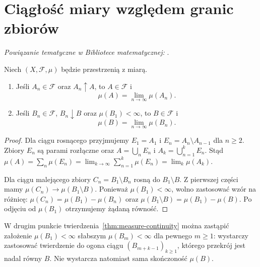 \section{Ciągłość miary względem granic zbiorów}

\noindent\emph{Powiązanie tematyczne w Bibliotece matematycznej:} .


\begin{twierdzenie}
\label{thm:measure-continuity}
Niech $(X,\mathcal F,\mu)$ będzie przestrzenią z miarą.
\begin{enumerate}
\item Jeśli $A_n\in\mathcal F$ oraz $A_n\uparrow A$, to
$A\in\mathcal F$ i
\begin{equation}
\label{eq:continuity-below}
\mu(A)=\lim_{n\to\infty}\mu(A_n).
\end{equation}
\item Jeśli $B_n\in\mathcal F$, $B_n\downarrow B$ oraz
$\mu(B_1)<\infty$, to $B\in\mathcal F$ i
\begin{equation}
\label{eq:continuity-above}
\mu(B)=\lim_{n\to\infty}\mu(B_n).
\end{equation}
\end{enumerate}
\end{twierdzenie}
\begin{proof}
Dla ciągu rosnącego przyjmujemy $E_1=A_1$ i
$E_n=A_n\setminus A_{n-1}$ dla $n\geq2$.
Zbiory $E_n$ są parami rozłączne oraz
$A=\bigcup_nE_n$ i $A_k=\bigcup_{n=1}^kE_n$.
Stąd
$\mu(A)=\sum_n\mu(E_n)=\lim_{k\to\infty}\sum_{n=1}^k\mu(E_n)
=\lim_k\mu(A_k)$.

Dla ciągu malejącego zbiory $C_n=B_1\setminus B_n$ rosną
do $B_1\setminus B$. Z pierwszej części mamy
$\mu(C_n)\to\mu(B_1\setminus B)$. Ponieważ
$\mu(B_1)<\infty$, wolno zastosować wzór na różnicę:
$\mu(C_n)=\mu(B_1)-\mu(B_n)$ oraz
$\mu(B_1\setminus B)=\mu(B_1)-\mu(B)$.
Po odjęciu od $\mu(B_1)$ otrzymujemy żądaną równość.
\end{proof}

\begin{uwaga}
W drugim punkcie twierdzenia~\ref{thm:measure-continuity} można
zastąpić założenie $\mu(B_1)<\infty$ słabszym
$\mu(B_m)<\infty$ dla pewnego $m\ge1$: wystarczy
zastosować twierdzenie do ogona ciągu
$(B_{m+k-1})_{k\ge1}$, którego przekrój jest nadal równy $B$.
Nie wystarcza natomiast sama skończoność $\mu(B)$.
\end{uwaga}

